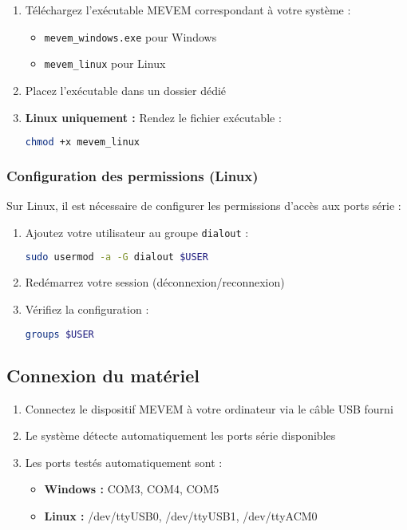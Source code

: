 \documentclass[12pt,a4paper]{article}
\begin{document}
\begin{enumerate}
    \item Téléchargez l'exécutable MEVEM correspondant à votre système :
    \begin{itemize}
        \item \texttt{mevem\_windows.exe} pour Windows
        \item \texttt{mevem\_linux} pour Linux
    \end{itemize}
    
    \item Placez l'exécutable dans un dossier dédié
    
    \item \textbf{Linux uniquement :} Rendez le fichier exécutable :
    \begin{lstlisting}[language=bash]
chmod +x mevem_linux
    \end{lstlisting}
\end{enumerate}

\subsubsection{Configuration des permissions (Linux)}

Sur Linux, il est nécessaire de configurer les permissions d'accès aux ports série :

\begin{enumerate}
    \item Ajoutez votre utilisateur au groupe \texttt{dialout} :
    \begin{lstlisting}[language=bash]
sudo usermod -a -G dialout $USER
    \end{lstlisting}
    
    \item Redémarrez votre session (déconnexion/reconnexion)
    
    \item Vérifiez la configuration :
    \begin{lstlisting}[language=bash]
groups $USER
    \end{lstlisting}
\end{enumerate}

\subsection{Connexion du matériel}

\begin{enumerate}
    \item Connectez le dispositif MEVEM à votre ordinateur via le câble USB fourni
    \item Le système détecte automatiquement les ports série disponibles
    \item Les ports testés automatiquement sont :
    \begin{itemize}
        \item \textbf{Windows :} COM3, COM4, COM5
        \item \textbf{Linux :} /dev/ttyUSB0, /dev/ttyUSB1, /dev/ttyACM0
    \end{itemize}
\end{enumerate}
\end{document}
